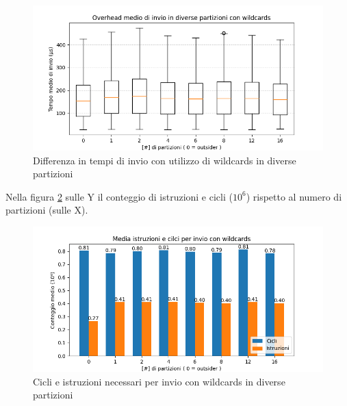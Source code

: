 \begin{figure}[H]
    \centering
    \includegraphics[width=\textwidth]{./results/test2_wildcards.png}

    \caption{Differenza in tempi di invio con utilizzo di wildcards in diverse partizioni}\label{fig:test2wildcards}
\end{figure}
Nella figura \ref{fig:test2cicl} sulle Y il conteggio di istruzioni e cicli ($10^6$) rispetto al numero di partizioni (sulle X).
\begin{figure}[H]
    \centering
    \includegraphics[width=\textwidth]{./results/test2_cyclinstr.png}
    \caption{Cicli e istruzioni necessari per invio con wildcards in diverse partizioni}\label{fig:test2cicl}
\end{figure}




